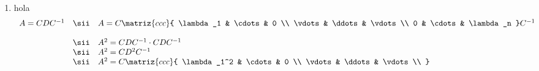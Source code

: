 \begin{enumerate}[label=\arabic*.]
  \item hola
        $$
          \begin{array}{rcl}
            A = CDC^{-1}
                        & \sii                                                                                                                                &
            A = C
            \matriz{ccc}{
            \lambda_1   & \cdots                                                                                                                              & 0           \\
            \vdots      & \ddots                                                                                                                              & \vdots      \\
            0           & \cdots                                                                                                                              & \lambda_n
            }
            C^{-1}                                                                                                                                                          \\\\
                        & \sii                                                                                                                                &
            A^2 = CDC^{-1} \cdot CDC^{-1}                                                                                                                                   \\
                        & \sii                                                                                                                                &
            A^2 = CD^2C^{-1}                                                                                                                                                \\
                        & \sii                                                                                                                                &
            A^2 = C
            \matriz{ccc}{
            \lambda_1^2 & \cdots                                                                                                                              & 0           \\
            \vdots      & \ddots                                                                                                                              & \vdots      \\
}
\end{array}$$
\end{enumerate}

